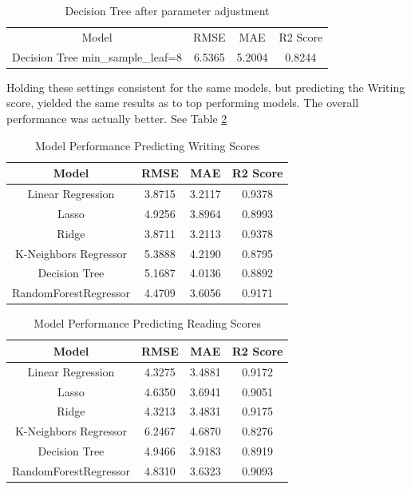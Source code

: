 \documentclass[man,floatsintext]{apa6} %
\begin{document}
\begin{table}[H]
    \centering
    \caption{Decision Tree after parameter adjustment}
    \begin{tabular}{|c|c|c|c|}
    \hline
        Model & RMSE & MAE & R2 Score\\
        Decision Tree min\_sample\_leaf=8 & 6.5365 & 5.2004 & 0.8244\\
        \hline
    \end{tabular}
    \label{tab:DecTreeControlled}
\end{table}
Holding these settings consistent for the same models, but predicting the Writing score, yielded the same results as to top performing models. The overall performance was actually better. See Table \ref{tab:InitModelPerfWrite}
\begin{table}[H]
    \centering
    \caption{Model Performance Predicting Writing Scores}
    \begin{tabular}{|c|c|c|c|}
    \hline
         Model & RMSE & MAE & R2 Score\\
         \hline\hline
         Linear Regression & 3.8715 & 3.2117 & 0.9378\\
         \hline
         Lasso & 4.9256 & 3.8964 & 0.8993\\
         \hline
         Ridge & 3.8711 & 3.2113 & 0.9378\\
         \hline
         K-Neighbors Regressor & 5.3888 & 4.2190 & 0.8795\\
         \hline
         Decision Tree & 5.1687 & 4.0136 & 0.8892\\
         \hline
         RandomForestRegressor & 4.4709 & 3.6056 & 0.9171\\
         \hline
    \end{tabular}
    \label{tab:InitModelPerfWrite}
\end{table}
\begin{table}[H]
    \centering
    \caption{Model Performance Predicting Reading Scores}
    \begin{tabular}{|c|c|c|c|}
    \hline
         Model & RMSE & MAE & R2 Score\\
         \hline\hline
         Linear Regression & 4.3275 & 3.4881 & 0.9172\\
         \hline
         Lasso & 4.6350 & 3.6941 & 0.9051\\
         \hline
         Ridge & 4.3213 & 3.4831 & 0.9175\\
         \hline
         K-Neighbors Regressor & 6.2467 & 4.6870 & 0.8276\\
         \hline
         Decision Tree & 4.9466 & 3.9183 & 0.8919\\
         \hline
         RandomForestRegressor & 4.8310 & 3.6323 & 0.9093\\
         \hline
    \end{tabular}
    \label{tab:InitModelPerfRead}
\end{table}
\end{document}
